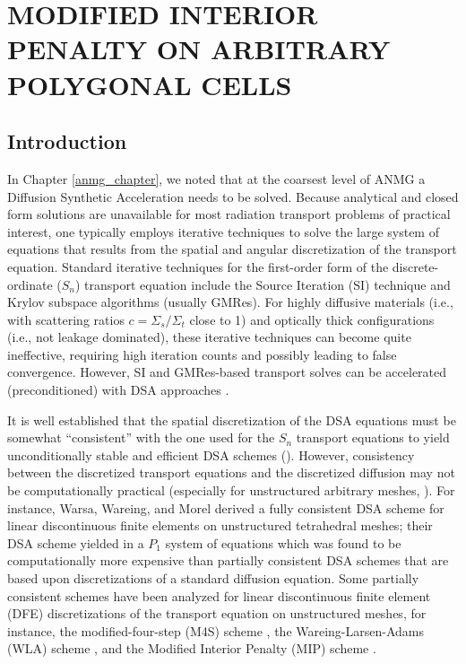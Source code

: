 \chapter{\uppercase{Modified Interior Penalty on Arbitrary Polygonal Cells}}
\label{mip_chapter}
\section{Introduction}
In Chapter \ref{anmg_chapter}, we noted that at the coarsest level of ANMG 
a Diffusion Synthetic Acceleration needs to be solved. 
Because analytical and closed form solutions are unavailable for most
radiation transport problems of practical interest, one typically employs
iterative techniques to solve the large system of equations that results from
the spatial and angular discretization of the transport equation. Standard
iterative techniques for the first-order form of the discrete-ordinate ($S_n$)
transport equation include the Source Iteration (SI) technique and Krylov 
subspace algorithms (usually GMRes). For highly diffusive materials (i.e., 
with scattering ratios $c=\Sigma_s / \Sigma_t $ close to 1) and optically 
thick configurations (i.e., not leakage dominated), these iterative techniques 
can become quite ineffective, requiring high iteration counts and possibly 
leading to false convergence. However, SI and GMRes-based transport solves 
can be accelerated (preconditioned) with DSA approaches 
\cite{dsa_ref,m4s,larsen_dsa,wla,mip,consistent_p1}. 

It is well established that the spatial discretization of the DSA equations
must be somewhat ``consistent'' with the one used for the $S_n$ transport equations to
yield unconditionally stable and efficient DSA schemes
(\cite{dsa_ref,m4s,larsen_dsa,wla,mip,consistent_p1}). However, 
consistency between the discretized transport equations and the discretized
diffusion may not be computationally practical (especially for unstructured
arbitrary meshes, \cite{dsa_ref}). For instance, Warsa, Wareing, and
Morel \cite{consistent_p1} derived a fully consistent DSA scheme for linear
discontinuous finite elements on unstructured tetrahedral meshes; their DSA
scheme yielded in a $P_1$ system of equations which was found to be
computationally more expensive than partially consistent DSA schemes that are
based upon discretizations of a standard diffusion equation. Some partially 
consistent schemes have been analyzed for linear discontinuous finite element
(DFE) discretizations of the transport equation on unstructured meshes, for
instance, the modified-four-step (M4S) scheme \cite{m4s}, the
Wareing-Larsen-Adams (WLA) scheme \cite{wla,wla_pwl}, and the Modified Interior
Penalty (MIP) scheme \cite{mip}.

